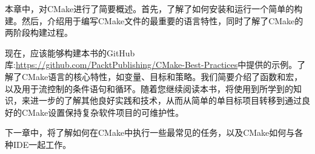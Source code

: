 本章中，对CMake进行了简要概述。首先，了解了如何安装和运行一个简单的构建。然后，介绍用于编写CMake文件的最重要的语言特性，同时了解了CMake的两阶段构建过程。

现在，应该能够构建本书的GitHub库:\url{https://github.com/PacktPublishing/CMake-Best-Practices}中提供的示例。了解了CMake语言的核心特性，如变量、目标和策略。我们简要介绍了函数和宏，以及用于流控制的条件语句和循环。随着您继续阅读本书，将使用到所学到的知识，来进一步的了解其他良好实践和技术，从而从简单的单目标项目转移到通过良好的CMake设置保持复杂软件项目的可维护性。

下一章中，将了解如何在CMake中执行一些最常见的任务，以及CMake如何与各种IDE一起工作。